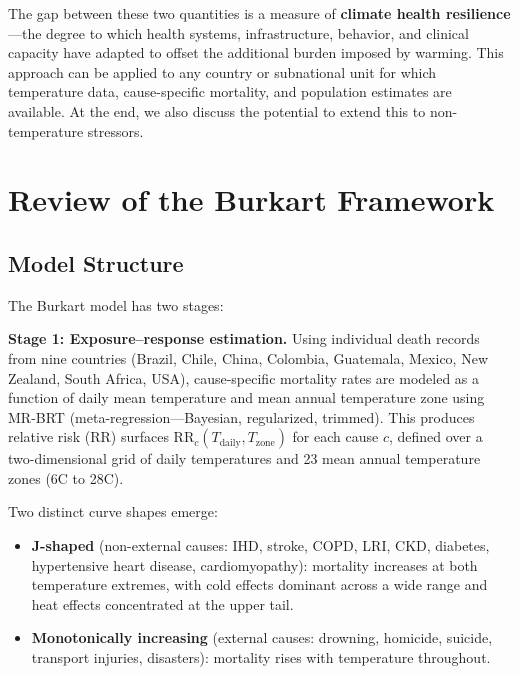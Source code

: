 \documentclass[11pt,a4paper]{article}
\begin{document}
The gap between these two quantities is a measure of \textbf{climate health resilience}---the degree to which health systems, infrastructure, behavior, and clinical capacity have adapted to offset the additional burden imposed by warming. This approach can be applied to any country or subnational unit for which temperature data, cause-specific mortality, and population estimates are available. At the end, we also discuss the potential to extend this to non-temperature stressors.

\section{Review of the Burkart Framework}

\subsection{Model Structure}

The Burkart model has two stages:

\textbf{Stage 1: Exposure--response estimation.} Using individual death records from nine countries (Brazil, Chile, China, Colombia, Guatemala, Mexico, New Zealand, South Africa, USA), cause-specific mortality rates are modeled as a function of daily mean temperature and mean annual temperature zone using MR-BRT (meta-regression---Bayesian, regularized, trimmed). This produces relative risk (RR) surfaces $\text{RR}_c(T_{\text{daily}}, T_{\text{zone}})$ for each cause $c$, defined over a two-dimensional grid of daily temperatures and 23 mean annual temperature zones (6\textdegree C to 28\textdegree C).

Two distinct curve shapes emerge:
\begin{itemize}[nosep]
  \item \textbf{J-shaped} (non-external causes: IHD, stroke, COPD, LRI, CKD, diabetes, hypertensive heart disease, cardiomyopathy): mortality increases at both temperature extremes, with cold effects dominant across a wide range and heat effects concentrated at the upper tail.
  \item \textbf{Monotonically increasing} (external causes: drowning, homicide, suicide, transport injuries, disasters): mortality rises with temperature throughout.
\end{itemize}
\end{document}

